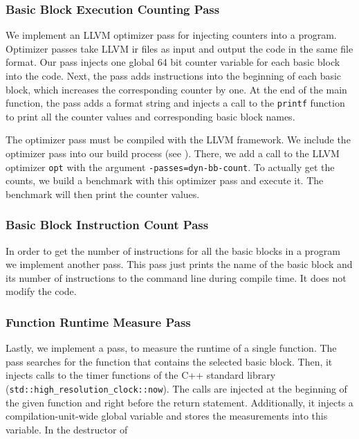 \subsubsection{Basic Block Execution Counting Pass}
\label{sec:approach:pass-count}
We implement an LLVM optimizer pass for injecting counters into a program.
Optimizer passes take LLVM \ac{ir} files as input and output the code in the same file format.
Our pass injects one global 64 bit counter variable for each basic block into the code.
Next, the pass adds instructions into the beginning of each basic block, which increases the corresponding counter by one.
At the end of the main function, the pass adds a format string and injects a call to the \lstinline{printf} function to print all the counter values and corresponding basic block names.

The optimizer pass must be compiled with the LLVM framework.
We include the optimizer pass into our build process (see ).
There, we add a call to the LLVM optimizer \lstinline{opt} with the argument \mbox{\lstinline{-passes=dyn-bb-count}}.
To actually get the counts, we build a benchmark with this optimizer pass and execute it.
The benchmark will then print the counter values.

\subsubsection{Basic Block Instruction Count Pass}
\label{sec:approach:instr-count}
In order to get the number of instructions for all the basic blocks in a program we implement another pass.
This pass just prints the name of the basic block and its number of instructions to the command line during compile time.
It does not modify the code.

\subsubsection{Function Runtime Measure Pass}
Lastly, we implement a pass, to measure the runtime of a single function.
The pass searches for the function that contains the selected basic block.
Then, it injects calls to the timer functions of the C++ standard library (\lstinline|std::high_resolution_clock::now|).
The calls are injected at the beginning of the given function and right before the return statement.
Additionally, it injects a compilation-unit-wide global variable and stores the measurements into this variable.
In the destructor of

